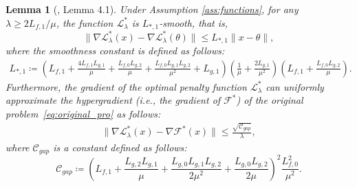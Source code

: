 \documentclass{article}
\theoremstyle{plain}
\newtheorem{lemma}[theorem]{Lemma}
\theoremstyle{definition}
\theoremstyle{remark}
\begin{document}
\begin{lemma}[\citealp{chennear2025}, Lemma 4.1]\label{lem:smoothness}
    Under Assumption \ref{ass:functions}, for any $\lambda \ge 2L_{f,1}/\mu$, the function $\mathcal{L}_{\lambda}^{*}$ is $L_{*,1}$-smooth, that is,
    \[
        \|\nabla \mathcal{L}_{\lambda}^{*}(x) - \nabla \mathcal{L}_{\lambda}^{*}(\theta)\| \le L_{*,1}\|x-\theta\|,
    \]
    where the smoothness constant is defined as follows: 
    \begin{align*}
        L_{*,1} \coloneqq \left(L_{f,1}+\frac{4L_{f,1}L_{g,1}}{\mu}+\frac{L_{f,0}L_{g,2}}{\mu}+\frac{L_{f,0}L_{g,1}L_{g,2}}{\mu^{2}}+L_{g,1}\right) \left(\frac{1}{\mu}+\frac{2L_{g,1}}{\mu^{2}}\right)\left(L_{f,1}+\frac{L_{f,0}L_{g,2}}{\mu}\right).
    \end{align*}
    Furthermore, the gradient of the optimal penalty function  $\mathcal{L}_{\lambda}^{*}$ can uniformly approximate the hypergradient (i.e., the gradient of $\mathcal{F}^{*}$) of the original problem~\eqref{eq:original_pro} as follows: 
\begin{align}\label{eq:gradient_gap_bound}
        \| \nabla \mathcal{L}_{\lambda}^{*}(x) - \nabla \mathcal{F}^{*}(x) \| \leq \frac{\sqrt{\mathcal{C}_{gap}}}{ \lambda}, %
    \end{align}
    where $\mathcal{C}_{gap}$ is a constant defined as follows: 
    \begin{equation}\label{def_cgap}
        \mathcal{C}_{gap} \coloneqq \left(L_{f,1}+\frac{L_{g,2}L_{g,1}}{\mu}+\frac{L_{g,0}L_{g,1}L_{g,2}}{2\mu^{2}}+\frac{L_{g,0}L_{g,2}}{2\mu}\right)^{2}\frac{L_{f,0}^{2}}{ \mu^{2}}.
    \end{equation}
\end{lemma}
\end{document}
